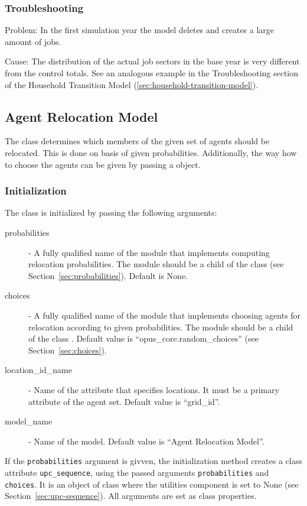 \subsubsection{Troubleshooting}
%
\begin{description}
\item{Problem:} In the first simulation year the model deletes and creates a large amount of jobs.
\item{Cause:} The distribution of the actual job sectors in the base year is very different 
from the control totals. See an analogous example in the Troubleshooting section of the Household Transition 
Model (\ref{sec:household-transition-model}).
\end{description}

%
\subsection{Agent Relocation Model}
\modelsindex
%
\label{sec:agent-relocation-model}

The class  \modelsindex determines which members of the given
set of agents should be relocated. This is done on basis of given
probabilities. Additionally, the way how to choose the agents can be given by
passing a  object.

%
\subsubsection{Initialization}
%
The class is initialized by passing the following arguments:
\begin{description}
\item[probabilities] - A fully qualified name of the module that implements
  computing relocation probabilities. The module should be a child of the
   class  (see Section~\ref{sec:probabilities}). 
  Default is None.
\item[choices] - A fully qualified name of the module that implements choosing
  agents for relocation according to given probabilities. The module should be
  a child of the  class .  Default value is
  ``opus_core.random_choices'' (see Section~\ref{sec:choices}).
\item[location_id_name] - Name of the attribute \attributesindex that specifies locations. It
  must be a primary attribute \primaryattributesindex of the agent set. Default value is
  ``grid_id''.
\item[model_name] \modelsindex - Name of the model. \modelsindex Default value is ``Agent Relocation
  Model''. \modelsindex
\end{description}
If the \verb|probabilities| argument is givven, 
the initialization method creates a class attribute \attributesindex \verb|upc_sequence|, using
the passed arguments \verb|probabilities| and \verb|choices|. It is an object
of class  where the utilities component is set to None
(see Section~\ref{sec:upc-sequence}). All arguments are set as class properties. 

